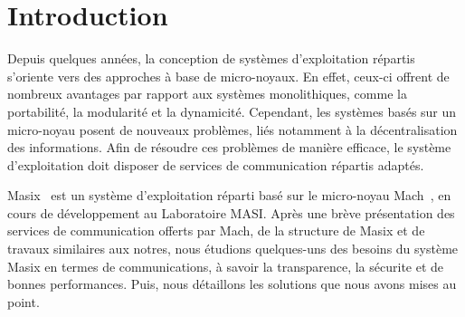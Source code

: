 


\newcommand {\figps} [4]
{
    \begin{figure} [ht]
       \begin{center}
		\leavevmode
                \epsfxsize=#2
                \epsfysize=#3
                \epsfbox {#1.ps}
        	\caption {#4}
        	\label {fig:#1}
        \end{center}
    \end{figure}
}



\frenchspacing



\IEEEheader

\sloppy

\section{Introduction}

Depuis quelques ann\'ees, la conception de syst\`emes d'exploitation r\'epartis
s'oriente vers des approches \`a base de micro-noyaux. En effet, ceux-ci offrent de nombreux avantages par rapport aux syst\`emes monolithiques, comme
la portabilit\'e, la modularit\'e et la dynamicit\'e. 
Cependant, les syst\`emes bas\'es sur un micro-noyau posent de nouveaux 
probl\`emes, li\'es notamment \`a la d\'ecentralisation des informations. 
Afin de r\'esoudre ces probl\`emes de mani\`ere efficace, le syst\`eme 
d'exploitation doit disposer de services de communication r\'epartis adapt\'es.

Masix~\cite{masix:osf} est un syst\`eme d'exploitation r\'eparti bas\'e sur le 
micro-noyau Mach~\cite{mach:foundation}, en cours de d\'eveloppement au 
Laboratoire MASI. Apr\`es une br\`eve pr\'esentation des services de 
communication offerts par Mach, de la structure de Masix et de travaux 
similaires aux notres, nous \'etudions quelques-uns des besoins du syst\`eme 
Masix en termes de communications, \`a savoir la transparence, la s\'ecurite 
et de bonnes performances. Puis, nous d\'etaillons les solutions que nous
 avons mises au point.

